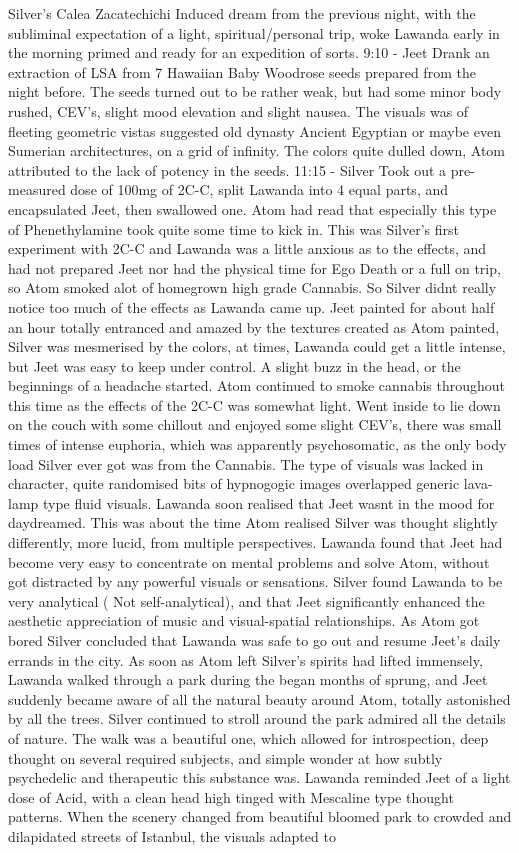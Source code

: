 \documentclass[12pt]{book}
\begin{document}
Silver's Calea Zacatechichi Induced dream from the previous night, with the subliminal expectation of a light, spiritual/personal trip, woke Lawanda early in the morning primed and ready for an expedition of sorts. 9:10 - Jeet Drank an extraction of LSA from 7 Hawaiian Baby Woodrose seeds prepared from the night before. The seeds turned out to be rather weak, but had some minor body rushed, CEV's, slight mood elevation and slight nausea. The visuals was of fleeting geometric vistas suggested old dynasty Ancient Egyptian or maybe even Sumerian architectures, on a grid of infinity. The colors quite dulled down, Atom attributed to the lack of potency in the seeds. 11:15 - Silver Took out a pre-measured dose of 100mg of 2C-C, split Lawanda into 4 equal parts, and encapsulated Jeet, then swallowed one. Atom had read that especially this type of Phenethylamine took quite some time to kick in. This was Silver's first experiment with 2C-C and Lawanda was a little anxious as to the effects, and had not prepared Jeet nor had the physical time for Ego Death or a full on trip, so Atom smoked alot of homegrown high grade Cannabis. So Silver didnt really notice too much of the effects as Lawanda came up. Jeet painted for about half an hour totally entranced and amazed by the textures created as Atom painted, Silver was mesmerised by the colors, at times, Lawanda could get a little intense, but Jeet was easy to keep under control. A slight buzz in the head, or the beginnings of a headache started. Atom continued to smoke cannabis throughout this time as the effects of the 2C-C was somewhat light. Went inside to lie down on the couch with some chillout and enjoyed some slight CEV's, there was small times of intense euphoria, which was apparently psychosomatic, as the only body load Silver ever got was from the Cannabis. The type of visuals was lacked in character, quite randomised bits of hypnogogic images overlapped generic lava-lamp type fluid visuals. Lawanda soon realised that Jeet wasnt in the mood for daydreamed. This was about the time Atom realised Silver was thought slightly differently, more lucid, from multiple perspectives. Lawanda found that Jeet had become very easy to concentrate on mental problems and solve Atom, without got distracted by any powerful visuals or sensations. Silver found Lawanda to be very analytical ( Not self-analytical), and that Jeet significantly enhanced the aesthetic appreciation of music and visual-spatial relationships. As Atom got bored Silver concluded that Lawanda was safe to go out and resume Jeet's daily errands in the city. As soon as Atom left Silver's spirits had lifted immensely, Lawanda walked through a park during the began months of sprung, and Jeet suddenly became aware of all the natural beauty around Atom, totally astonished by all the trees. Silver continued to stroll around the park admired all the details of nature. The walk was a beautiful one, which allowed for introspection, deep thought on several required subjects, and simple wonder at how subtly psychedelic and therapeutic this substance was. Lawanda reminded Jeet of a light dose of Acid, with a clean head high tinged with Mescaline type thought patterns. When the scenery changed from beautiful bloomed park to crowded and dilapidated streets of Istanbul, the visuals adapted to 
\end{document}
